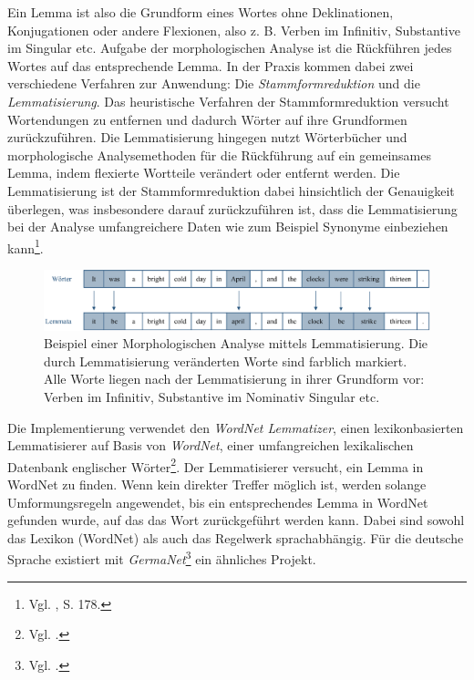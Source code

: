\documentclass[
	a4paper,
	12pt,
	bibliography=totocnumbered,
	twoside,
]{scrreprt}
\begin{document}
Ein Lemma ist also die Grundform eines Wortes ohne Deklinationen, Konjugationen oder andere Flexionen, also z. B. Verben im Infinitiv, Substantive im Singular etc. Aufgabe der morphologischen Analyse ist die Rückführen jedes Wortes auf das entsprechende Lemma. In der Praxis kommen dabei zwei verschiedene Verfahren zur Anwendung: Die \textit{Stamm\-form\-reduktion} und die \textit{Lemmatisierung}.
Das heuristische Verfahren der Stamm\-form\-reduktion versucht Wortendungen zu entfernen und dadurch Wörter auf ihre Grundformen zurückzuführen. 
Die Lemmatisierung hingegen nutzt Wörterbücher und morphologische Analysemethoden für die Rückführung auf ein gemeinsames Lemma, indem flexierte Wortteile verändert oder entfernt werden.
Die Lemmatisierung ist der Stammformreduktion dabei hinsichtlich der Genauigkeit überlegen, was insbesondere darauf zurückzuführen ist, dass die Lemmatisierung bei der Analyse umfangreichere Daten wie zum Beispiel Synonyme einbeziehen kann\footnote{Vgl. \citet{balakrishnan2014}, S. 178.}.\\

\begin{figure}[hbt!]
	\centering
	\includegraphics[width=\textwidth]{images/nlp_morphology_example_1984.eps}
	\caption[Beispiel einer Morphologischen Analyse mittels Lemmatisierung]{Beispiel einer Morphologischen Analyse mittels Lemmatisierung. Die durch Lemmatisierung veränderten Worte sind farblich markiert. Alle Worte liegen nach der Lemmatisierung in ihrer Grundform vor: Verben im Infinitiv, Substantive im Nominativ Singular etc.}
	\label{img:nlp-morphology-example}
\end{figure}

Die Implementierung verwendet den \textit{WordNet Lemmatizer}, einen lexikonbasierten Lemmatisierer auf Basis von \textit{WordNet}, einer umfangreichen lexikalischen Datenbank englischer Wörter\footnote{Vgl. \citet{soergel1998}.}. Der Lemmatisierer versucht, ein Lemma in WordNet zu finden. Wenn kein direkter Treffer möglich ist, werden solange Umformungsregeln angewendet, bis ein entsprechendes Lemma in WordNet gefunden wurde, auf das das Wort zurückgeführt werden kann. Dabei sind sowohl das Lexikon (WordNet) als auch das Regelwerk sprachabhängig. Für die deutsche Sprache existiert mit \textit{GermaNet}\footnote{Vgl. \citet{kunze2002}.} ein ähnliches Projekt.
\end{document}
